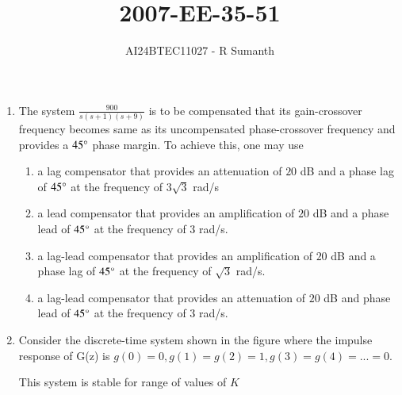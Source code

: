 \documentclass[journal,12pt,onecolumn]{IEEEtran}
\theoremstyle{remark}
\begin{document}

\vspace{3cm}

\title{\textbf{2007-EE-35-51}}
\author{AI24BTEC11027 - R Sumanth}
\maketitle
\bigskip

\renewcommand{\thefigure}{\theenumi}
\renewcommand{\thetable}{\theenumi}
\setlength{\columnsep}{2.5em}
\begin{enumerate}
    

\item The system $\frac{900}{s(s+1)(s+9)}$ is to be compensated that its gain-crossover frequency becomes same as its uncompensated phase-crossover frequency and provides a $45 \degree$ phase margin. To achieve this, one may use 
\begin{enumerate}
    \item a lag compensator that provides an attenuation of $20$ dB and a phase lag of $45\degree$ at the frequency of $3\sqrt{3}$ rad/s
    \item a lead compensator that provides an amplification of $20$ dB and a phase lead of $45 \degree$ at the frequency of $3$ rad/s.
    \item a lag-lead compensator that provides an amplification of $20$ dB and a phase lag of $45 \degree$ at the frequency of $\sqrt{3}$ rad/s.
    \item a lag-lead compensator that provides an attenuation of $20$ dB and phase lead of $45 \degree$ at the frequency of $3$ rad/s.\\
\end{enumerate} 

\item Consider the discrete-time system shown in the figure where the impulse response of G(z) is $g(0)=0, g(1)=g(2)=1, g(3)=g(4)=...=0.$ \\


 This system is stable for range of values of $K$ 
 

\end{enumerate}
\end{document}
